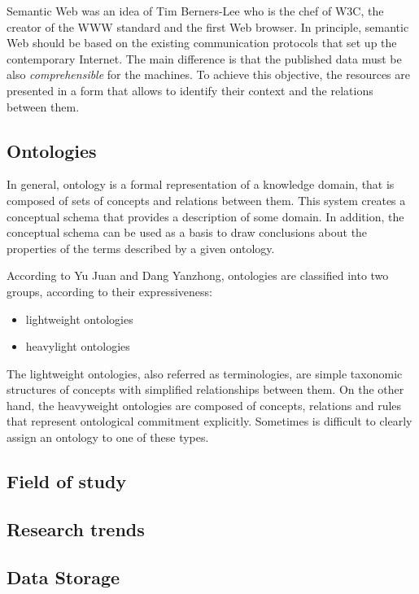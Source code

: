 Semantic Web was an idea of Tim Berners-Lee who is the chef of W3C, the creator
of the WWW standard and the first Web browser. In principle, semantic Web should
be based on the existing communication protocols that set up the contemporary
Internet. The main difference is that the published data must be also
\textit{comprehensible} for the machines. To achieve this objective, the
resources are presented in a form that allows to identify their context
and the relations between them.

\subsection{Ontologies}
\label{sec:Ontology}
In general, ontology is a formal representation of a knowledge domain, that
is composed of sets of concepts and relations between them. This system creates
a conceptual schema that provides a description of some domain. In addition,
the conceptual schema can be used as a basis to draw conclusions about the
properties of the terms described by a given ontology. 

According to Yu Juan and Dang Yanzhong\cite{5592098}, ontologies are classified
into two groups, according to their expressiveness:
\begin{itemize}
  \item lightweight ontologies
  \item heavylight ontologies
\end{itemize}

The lightweight ontologies, also referred as terminologies, are simple taxonomic
structures of concepts with simplified relationships between them. On the
other hand, the heavyweight ontologies  are composed of concepts, relations and
rules that represent ontological commitment explicitly. Sometimes is difficult
to clearly assign an ontology to one of these types.

\subsection{Field of study}

\subsection{Research trends}

\subsection{Data Storage}


